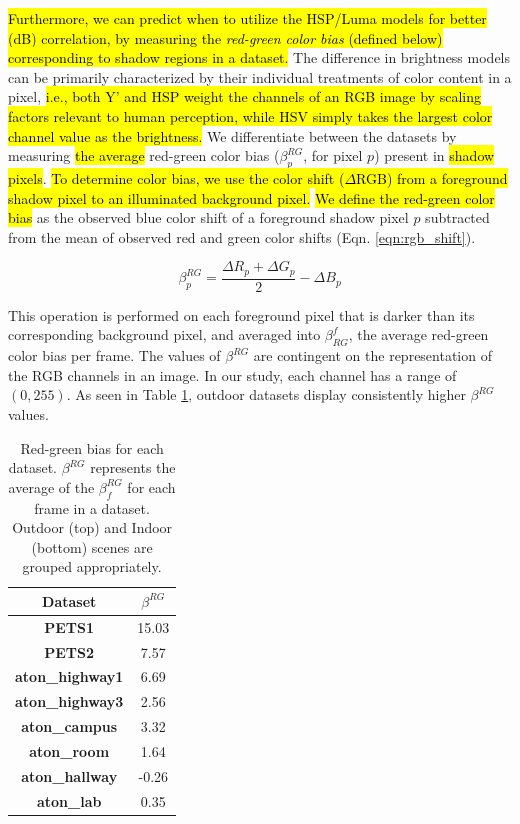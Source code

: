\documentclass[12pt]{report}
\begin{document}
\hl{Furthermore, we can predict when to utilize the HSP/Luma models for better (dB) correlation, by measuring the \textit{red-green color bias }(defined below) corresponding to shadow regions in a dataset.} The difference in brightness models can be primarily characterized by their individual treatments of color content in a pixel, \hl{i.e., both Y' and HSP weight the channels of an RGB image by scaling factors relevant to human perception, while HSV simply takes the largest color channel value as the brightness.} We differentiate between the datasets by measuring \hl{the average} red-green color bias ($\beta^{RG}_{p}$, for pixel $p$) present in \hl{shadow pixels}. \hl{To determine color bias, we use the color shift ($\Delta$RGB) from a foreground shadow pixel to an illuminated background pixel.} \hl{We define the red-green color bias} as the observed blue color shift of a foreground shadow pixel $p$ subtracted from the mean of observed red and green color shifts (Eqn. \ref{eqn:rgb_shift}).

\begin{equation}
\beta^{RG}_{p} = \dfrac{\Delta R_{p} + \Delta G_{p}}{2} - \Delta B_{p}
\label{eqn:rgb_shift}
\end{equation}

This operation is performed on each foreground pixel that is darker than its corresponding background pixel, and averaged into $\beta^{f}_{RG}$, the average red-green color bias per frame. The values of $\beta^{RG}$ are contingent on the representation of the RGB channels in an image. In our study, each channel has a range of $(0, 255)$. As seen in Table \ref{table:rg_bias}, outdoor datasets display consistently higher $\beta^{RG}$ values.

\begin{table}
\centering
\begin{tabular}{ |c|c| }
	\hline
	\textbf{Dataset} & \textbf{$\beta^{RG}$} \\
	\hline
	\hline
	\textbf{PETS1} & 15.03 \\
	\hline
	\textbf{PETS2} & 7.57 \\
	\hline
	\textbf{aton\_highway1} & 6.69 \\
	\hline
	\textbf{aton\_highway3} & 2.56 \\
	\hline
	\textbf{aton\_campus} & 3.32 \\
	\hline
	\hline
	\textbf{aton\_room} & 1.64 \\
	\hline
	\textbf{aton\_hallway} & -0.26 \\
	\hline
	\textbf{aton\_lab} & 0.35 \\
	\hline
\end{tabular}
\caption{Red-green bias for each dataset. $\beta^{RG}$ represents the average of the $\beta^{RG}_{f}$ for each frame in a dataset. Outdoor (top) and Indoor (bottom) scenes are grouped appropriately.}
\label{table:rg_bias}
\end{table}
\end{document}
